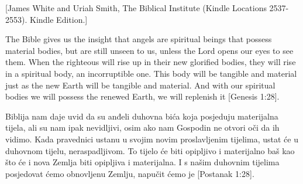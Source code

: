 [James White and Uriah Smith, The Biblical Institute (Kindle Locations 2537-2553). Kindle Edition.]


The Bible gives us the insight that angels are spiritual beings that possess material bodies, but are still unseen to us, unless the Lord opens our eyes to see them. When the righteous will rise up in their new glorified bodies, they will rise in a spiritual body, an incorruptible one. This body will be tangible and material just as the new Earth will be tangible and material. And with our spiritual bodies we will possess the renewed Earth, we will replenish it [Genesis 1:28].


Biblija nam daje uvid da su anđeli duhovna bića koja posjeduju materijalna tijela, ali su nam ipak nevidljivi, osim ako nam Gospodin ne otvori oči da ih vidimo. Kada pravednici ustanu u svojim novim proslavljenim tijelima, ustat će u duhovnom tijelu, neraspadljivom. To tijelo će biti opipljivo i materijalno baš kao što će i nova Zemlja biti opipljiva i materijalna. I s našim duhovnim tijelima posjedovat ćemo obnovljenu Zemlju, napučit ćemo je [Postanak 1:28].
